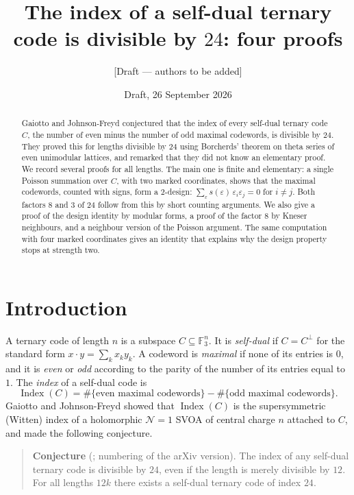 \documentclass[11pt]{amsart}
\title[The index of a self-dual ternary code]{The index of a self-dual ternary code is divisible by \texorpdfstring{$24$}{24}: four proofs}
\author{[Draft --- authors to be added]}
\date{Draft, 26 September 2026}
\theoremstyle{definition}
\newcommand{\F}{\mathbb{F}_3}
\newcommand{\Index}{\operatorname{Index}}
\begin{document}
\begin{abstract}
Gaiotto and Johnson-Freyd conjectured that the index of every self-dual ternary code $C$, the
number of even minus the number of odd maximal codewords, is divisible by $24$. They proved this for lengths divisible by $24$
using Borcherds' theorem on theta series of even unimodular lattices, and remarked that they did not
know an elementary proof. We record several proofs for all lengths. The main one is finite and
elementary: a single Poisson summation over $C$, with two marked coordinates, shows that the
maximal codewords, counted with signs, form a $2$-design: $\sum_{\varepsilon}s(\varepsilon)\,\varepsilon_i\varepsilon_j=0$
for $i\ne j$. Both factors $8$ and $3$ of $24$ follow from this by short counting arguments.
We also give a proof of the design identity by modular forms, a proof of the factor $8$ by Kneser
neighbours, and a neighbour version of the Poisson argument. The same computation with four marked
coordinates gives an identity that explains why the design property stops at strength two.
\end{abstract}
\maketitle

\section{Introduction}

A ternary code of length $n$ is a subspace $C\subseteq\F^n$. It is \emph{self-dual} if
$C=C^\perp$ for the standard form $x\cdot y=\sum_k x_ky_k$. A codeword is \emph{maximal} if none of
its entries is $0$, and it is \emph{even} or \emph{odd} according to the parity of the number of
its entries equal to $1$. The \emph{index} of a self-dual code is
\[
  \Index(C)=\#\{\text{even maximal codewords}\}-\#\{\text{odd maximal codewords}\}.
\]
Gaiotto and Johnson-Freyd \cite{GJF} showed that $\Index(C)$ is the supersymmetric (Witten) index
of a holomorphic $\mathcal N=1$ SVOA of central charge $n$ attached to $C$, and made the following
conjecture.

\begin{quote}
\textbf{Conjecture} (\cite[Conj.~1.4]{GJF}; numbering of the arXiv version). The index of any
self-dual ternary code is divisible by $24$, even if the length is merely divisible by $12$. For all
lengths $12k$ there exists a self-dual ternary code of index $24$.
\end{quote}
\end{document}
